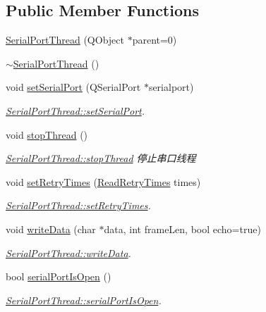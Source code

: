\subsection*{Public Member Functions}
\begin{DoxyCompactItemize}
\item 
\mbox{\hyperlink{class_serial_port_thread_aa842675091fa3c6bb2d840bf73a246ed}{Serial\+Port\+Thread}} (Q\+Object $\ast$parent=0)
\item 
\mbox{\hyperlink{class_serial_port_thread_acb85c5610387d944672514d3ed81c72f}{$\sim$\+Serial\+Port\+Thread}} ()
\item 
void \mbox{\hyperlink{class_serial_port_thread_a7f6a1a41be1727ce2549aa0d8e386340}{set\+Serial\+Port}} (Q\+Serial\+Port $\ast$serialport)
\begin{DoxyCompactList}\small\item\em \mbox{\hyperlink{class_serial_port_thread_a7f6a1a41be1727ce2549aa0d8e386340}{Serial\+Port\+Thread\+::set\+Serial\+Port}}. \end{DoxyCompactList}\item 
void \mbox{\hyperlink{class_serial_port_thread_ae7403dd74cb71b0e925e933073020cd2}{stop\+Thread}} ()
\begin{DoxyCompactList}\small\item\em \mbox{\hyperlink{class_serial_port_thread_ae7403dd74cb71b0e925e933073020cd2}{Serial\+Port\+Thread\+::stop\+Thread}} 停止串口线程 \end{DoxyCompactList}\item 
void \mbox{\hyperlink{class_serial_port_thread_a0508026c05c1c2b2c1d2912be2162a9f}{set\+Retry\+Times}} (\mbox{\hyperlink{serialportthread_8h_a58c73f770d96826095f8f3824737f67b}{Read\+Retry\+Times}} times)
\begin{DoxyCompactList}\small\item\em \mbox{\hyperlink{class_serial_port_thread_a0508026c05c1c2b2c1d2912be2162a9f}{Serial\+Port\+Thread\+::set\+Retry\+Times}}. \end{DoxyCompactList}\item 
void \mbox{\hyperlink{class_serial_port_thread_a16e0dbd72535df1b954ed3c4598f633a}{write\+Data}} (char $\ast$data, int frame\+Len, bool echo=true)
\begin{DoxyCompactList}\small\item\em \mbox{\hyperlink{class_serial_port_thread_a16e0dbd72535df1b954ed3c4598f633a}{Serial\+Port\+Thread\+::write\+Data}}. \end{DoxyCompactList}\item 
bool \mbox{\hyperlink{class_serial_port_thread_abbdd068503223fcd5f3d2376eb78c50e}{serial\+Port\+Is\+Open}} ()
\begin{DoxyCompactList}\small\item\em \mbox{\hyperlink{class_serial_port_thread_abbdd068503223fcd5f3d2376eb78c50e}{Serial\+Port\+Thread\+::serial\+Port\+Is\+Open}}. \end{DoxyCompactList}\end{DoxyCompactItemize}
